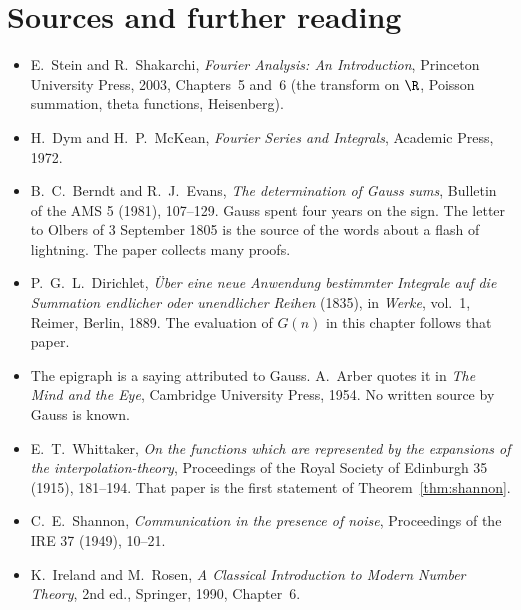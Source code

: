 \section*{Sources and further reading}

\begin{itemize}
\item E.~Stein and R.~Shakarchi, \emph{Fourier Analysis: An Introduction}, Princeton University Press, 2003, Chapters~5
and~6 (the transform on $\R$, Poisson summation, theta functions, Heisenberg).
\item H.~Dym and H.~P.~McKean, \emph{Fourier Series and Integrals}, Academic Press, 1972.
\item B.~C.~Berndt and R.~J.~Evans, \emph{The determination of Gauss sums}, Bulletin of the AMS 5 (1981), 107--129. Gauss spent four years on the sign. The letter to Olbers of 3 September 1805 is the source of the words about a flash of lightning. The paper collects many proofs.
\item P.~G.~L.~Dirichlet, \emph{\"Uber eine neue Anwendung bestimmter Integrale auf die Summation endlicher oder unendlicher
Reihen} (1835), in \emph{Werke}, vol.~1, Reimer, Berlin, 1889. The evaluation of $G(n)$ in this chapter follows that paper.
\item The epigraph is a saying attributed to Gauss. A.~Arber quotes it in \emph{The Mind and the Eye}, Cambridge
University Press, 1954. No written source by Gauss is known.
\item E.~T.~Whittaker, \emph{On the functions which are represented by the expansions of the interpolation-theory},
Proceedings of the Royal Society of Edinburgh 35 (1915), 181--194. That paper is the first statement of Theorem~\ref{thm:shannon}.
\item C.~E.~Shannon, \emph{Communication in the presence of noise}, Proceedings of the IRE 37 (1949), 10--21.
\item K.~Ireland and M.~Rosen, \emph{A Classical Introduction to Modern Number Theory}, 2nd ed., Springer, 1990, Chapter~6.
\end{itemize}
